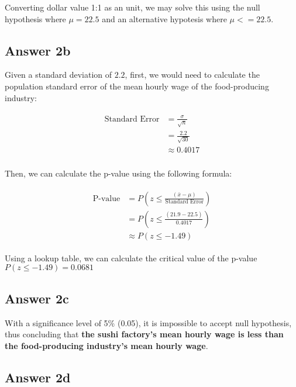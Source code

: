\documentclass[
	11pt, %
]{assignment}
\begin{document}
Converting dollar value 1:1 as an unit, we may solve this using the null hypothesis where \( \mu = 22.5\) and an alternative hypotesis where \( \mu <= 22.5\).

\subsection*{Answer 2b}
Given a standard deviation of \(2.2\), first, we would need to calculate the population standard error of the mean hourly wage of the food-producing industry:

\begin{align}
	\begin{aligned}
		\text{Standard Error} & = \frac{\sigma}{\sqrt{n}} \\
		                      & = \frac{2.2}{\sqrt{30}}   \\
		                      & \approx 0.4017            \\
	\end{aligned}
\end{align}

Then, we can calculate the p-value using the following formula:

\begin{align}
	\begin{aligned}
		\text{P-value} & = P(z \leq \frac{(\bar{x} - \mu)}{\text{Standard Error}}) \\
		               & = P(z \leq \frac{(21.9 - 22.5)}{0.4017})                  \\
		               & \approx P(z \leq -1.49)
	\end{aligned}
\end{align}

Using a lookup table, we can calculate the critical value of the p-value \(P(z \leq -1.49) = 0.0681\)

\subsection*{Answer 2c}

With a significance level of 5\% (0.05), it is impossible to accept null hypothesis, thus concluding that \textbf{the sushi factory's mean hourly wage is less than the food-producing industry's mean hourly wage}.

\subsection*{Answer 2d}
\end{document}
